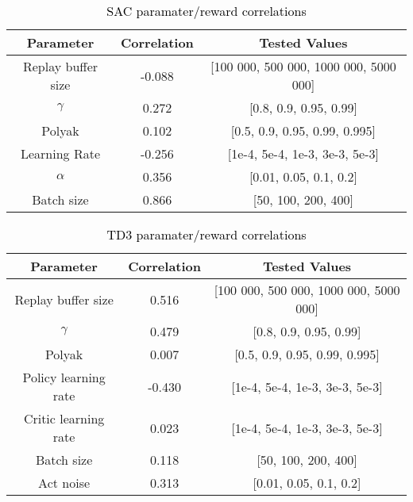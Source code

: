 \documentclass[letterpaper, 10 pt, conference]{ieeeconf} %
\newcommand{\rev}[1]{\textcolor{black}{#1}}
\begin{document}
    
    \begin{table*}[t]
        \centering
        \caption{\rev{SAC paramater/reward correlations}}
        \rev{
        \begin{tabular}{c|c|c}
            \hline
            Parameter    & Correlation & Tested Values \\ \hline
            Replay buffer size  & -0.088 & [100 000, 500 000, 1000 000, 5000 000] \\
            $\gamma$        &  0.272 & [0.8, 0.9, 0.95, 0.99] \\
            Polyak       &  0.102 & [0.5, 0.9, 0.95, 0.99, 0.995] \\
            Learning Rate           & -0.256 & [1e-4, 5e-4, 1e-3, 3e-3, 5e-3] \\
            $\alpha$        &  0.356 & [0.01, 0.05, 0.1, 0.2] \\
            Batch size   &  0.866 & [50, 100, 200, 400] \\ \hline
        \end{tabular}
        }
        \label{tab:sac_corr}
    \end{table*}
    
    \begin{table*}[t]
        \centering
        \caption{\rev{TD3 paramater/reward correlations}}
        \rev{
        \begin{tabular}{c|c|c}
            \hline
            Parameter    & Correlation & Tested Values \\ \hline
            Replay buffer size  &  0.516 & [100 000, 500 000, 1000 000, 5000 000] \\
            $\gamma$        &  0.479 & [0.8, 0.9, 0.95, 0.99] \\
            Polyak       &  0.007 & [0.5, 0.9, 0.95, 0.99, 0.995] \\
            Policy learning rate        & -0.430 & [1e-4, 5e-4, 1e-3, 3e-3, 5e-3] \\
            Critic learning rate         &  0.023 & [1e-4, 5e-4, 1e-3, 3e-3, 5e-3] \\
            Batch size   &  0.118 & [50, 100, 200, 400] \\
            Act noise    &  0.313 & [0.01, 0.05, 0.1, 0.2] \\ \hline
        \end{tabular}
        }
        \label{tab:td3_corr}
    \end{table*}
    
\end{document}
